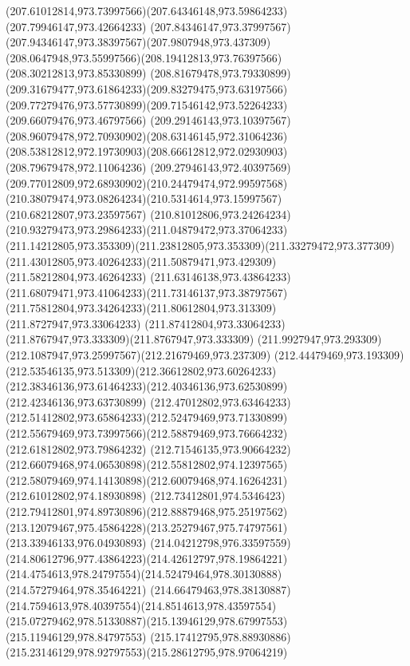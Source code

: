 {{  \curveto(207.61012814,973.73997566)(207.64346148,973.59864233)(207.79946147,973.42664233)
  \curveto(207.84346147,973.37997567)(207.94346147,973.38397567)(207.9807948,973.437309)
  \curveto(208.0647948,973.55997566)(208.19412813,973.76397566)(208.30212813,973.85330899)
  \curveto(208.81679478,973.79330899)(209.31679477,973.61864233)(209.83279475,973.63197566)
  \curveto(209.77279476,973.57730899)(209.71546142,973.52264233)(209.66079476,973.46797566)
  \curveto(209.29146143,973.10397567)(208.96079478,972.70930902)(208.63146145,972.31064236)
  \curveto(208.53812812,972.19730903)(208.66612812,972.02930903)(208.79679478,972.11064236)
  \curveto(209.27946143,972.40397569)(209.77012809,972.68930902)(210.24479474,972.99597568)
  \curveto(210.38079474,973.08264234)(210.5314614,973.15997567)(210.68212807,973.23597567)
  \curveto(210.81012806,973.24264234)(210.93279473,973.29864233)(211.04879472,973.37064233)
  \curveto(211.14212805,973.353309)(211.23812805,973.353309)(211.33279472,973.377309)
  \curveto(211.43012805,973.40264233)(211.50879471,973.429309)(211.58212804,973.46264233)
  \curveto(211.63146138,973.43864233)(211.68079471,973.41064233)(211.73146137,973.38797567)
  \curveto(211.75812804,973.34264233)(211.80612804,973.313309)(211.8727947,973.33064233)
  \curveto(211.87412804,973.33064233)(211.8767947,973.333309)(211.8767947,973.333309)
  \curveto(211.9927947,973.293309)(212.1087947,973.25997567)(212.21679469,973.237309)
  \curveto(212.44479469,973.193309)(212.53546135,973.513309)(212.36612802,973.60264233)
  \curveto(212.38346136,973.61464233)(212.40346136,973.62530899)(212.42346136,973.63730899)
  \curveto(212.47012802,973.63464233)(212.51412802,973.65864233)(212.52479469,973.71330899)
  \curveto(212.55679469,973.73997566)(212.58879469,973.76664232)(212.61812802,973.79864232)
  \curveto(212.71546135,973.90664232)(212.66079468,974.06530898)(212.55812802,974.12397565)
  \curveto(212.58079469,974.14130898)(212.60079468,974.16264231)(212.61012802,974.18930898)
  \curveto(212.73412801,974.5346423)(212.79412801,974.89730896)(212.88879468,975.25197562)
  \curveto(213.12079467,975.45864228)(213.25279467,975.74797561)(213.33946133,976.04930893)
  \curveto(214.04212798,976.33597559)(214.80612796,977.43864223)(214.42612797,978.19864221)
  \curveto(214.4754613,978.24797554)(214.52479464,978.30130888)(214.57279464,978.35464221)
  \curveto(214.66479463,978.38130887)(214.7594613,978.40397554)(214.8514613,978.43597554)
  \curveto(215.07279462,978.51330887)(215.13946129,978.67997553)(215.11946129,978.84797553)
  \curveto(215.17412795,978.88930886)(215.23146129,978.92797553)(215.28612795,978.97064219)
}}
